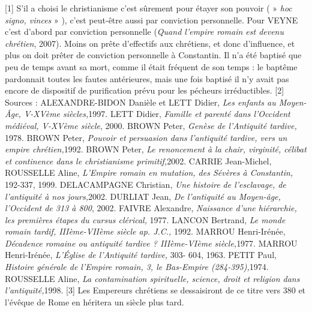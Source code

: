 [1] S'il a choisi le christianisme c'est sûrement pour étayer son pouvoir ( » \emph{hoc signo, vinces} » ), c'est peut-être aussi par conviction personnelle. Pour VEYNE c'est d'abord par conviction personnelle (\emph{Quand l'empire romain est devenu chrétien}, 2007). Moins on prête d'effectifs aux chrétiens, et donc d'influence, et plus on doit prêter de conviction personnelle à Constantin. Il n'a été baptisé que peu de temps avant sa mort, comme il était fréquent de son temps : le baptême pardonnait toutes les fautes antérieures, mais une fois baptisé il n'y avait pas encore de dispositif de purification prévu pour les pécheurs irréductibles. 
[2] Sources : ALEXANDRE-BIDON Danièle et LETT Didier, \emph{Les enfants au Moyen-Âge, V-XVème siècles,}1997. LETT Didier, \emph{Famille et parenté dans l'Occident médiéval, V-XVème siècle}, 2000. BROWN Peter, \emph{Genèse de l'Antiquité tardive,} 1978. BROWN Peter, \emph{Pouvoir et persuasion dans l'antiquité tardive, vers un empire chrétien,}1992. BROWN Peter, \emph{Le renoncement à la chair, virginité, célibat et continence dans le christianisme primitif,}2002. CARRIE Jean-Michel, ROUSSELLE Aline, \emph{L'Empire romain en mutation, des Sévères à Constantin,} 192-337, 1999. DELACAMPAGNE Christian, \emph{Une histoire de l'esclavage, de l'antiquité à nos jours,}2002. DURLIAT Jean, \emph{De l'antiquité au Moyen-âge, l'Occident de 313 à 800}, 2002. FAIVRE Alexandre, \emph{Naissance d'une hiérarchie, les premières étapes du cursus clérical,} 1977. LANCON Bertrand, \emph{Le monde romain tardif, IIIème-VIIème siècle ap. J.C.,} 1992. MARROU Henri-Irénée, \emph{Décadence romaine ou antiquité tardive ? IIIème-VIème siècle,}1977. MARROU Henri-Irénée, \emph{L'Église de l'Antiquité tardive,} 303- 604, 1963. PETIT Paul, \emph{Histoire générale de l'Empire romain, 3, le Bas-Empire (284-395),}1974. ROUSSELLE Aline, \emph{La contamination spirituelle, science, droit et religion dans l'antiquité,}1998. 
[3] Les Empereurs chrétiens se dessaisiront de ce titre vers 380 et l'évêque de Rome en héritera un siècle plus tard.
